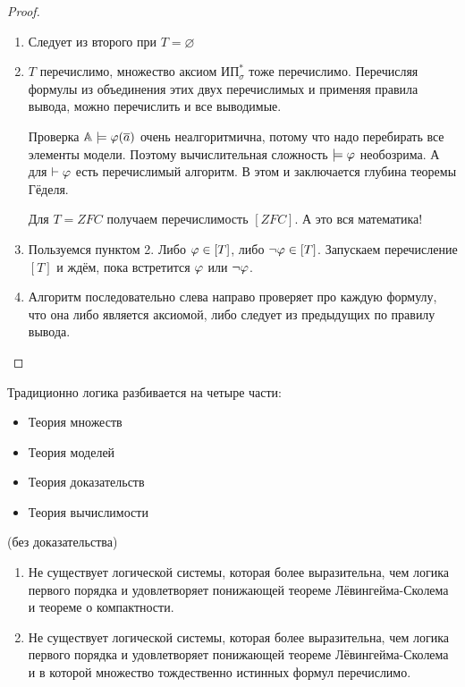 \begin{proof}\
    \begin{enumerate}
        \item Следует из второго при $T=\varnothing$ 
        \item $T$ перечислимо, множество аксиом $\text{ИП}^*_\sigma$ тоже перечислимо. Перечисляя формулы из объединения этих двух перечислимых и применяя правила вывода, можно перечислить и все выводимые.

        \begin{remark}
            Проверка $\mathbb{A}\models \varphi(\overline{a})$ очень неалгоритмична, потому что надо перебирать все элементы модели. Поэтому вычислительная сложность $\models \varphi$ необозрима. А для $\vdash\varphi$ есть перечислимый алгоритм. В этом и заключается глубина теоремы Гёделя.
        \end{remark}

        \begin{exmpl}
            Для $T = ZFC$ получаем перечислимость $[ZFC]$. А это вся математика!
        \end{exmpl}

        \item Пользуемся пунктом 2. Либо $\varphi\in[T]$, либо $\neg\varphi\in[T]$. Запускаем перечисление $[T]$ и ждём, пока встретится $\varphi$ или $\neg\varphi$.
        
        \item Алгоритм последовательно слева направо проверяет про каждую формулу, что она либо является аксиомой, либо следует из предыдущих по правилу вывода. 
    \end{enumerate}
\end{proof}


\begin{remark}
    Традиционно логика разбивается на четыре части:
    \begin{itemize}
        \item Теория множеств
        \item Теория моделей
        \item Теория доказательств
        \item Теория вычислимости
    \end{itemize}
\end{remark}

\begin{theorem}[Линдстрёма]
    (без доказательства)
    \begin{enumerate}
        \item Не существует логической системы, которая более выразительна, чем логика первого порядка и удовлетворяет понижающей теореме Лёвингейма-Сколема и теореме о компактности.
        \item Не существует логической системы, которая более выразительна, чем логика первого порядка и удовлетворяет понижающей теореме Лёвингейма-Сколема и в которой множество тождественно истинных формул перечислимо.
    \end{enumerate}
\end{theorem}



